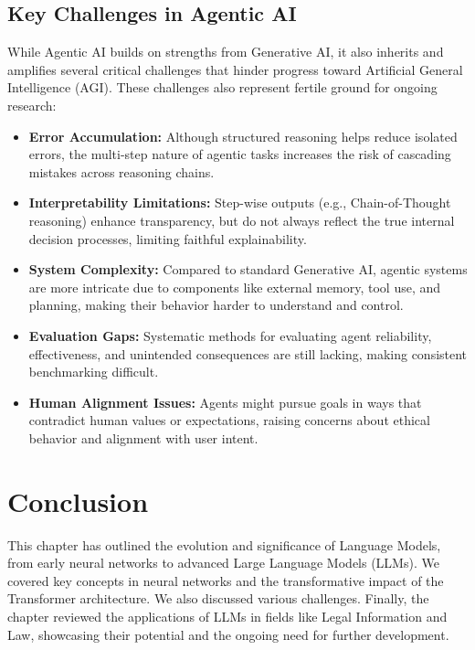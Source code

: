 \subsection{Key Challenges in Agentic AI}

While Agentic AI builds on strengths from Generative AI, it also inherits and amplifies several critical challenges that hinder progress toward Artificial General Intelligence (AGI). These challenges also represent fertile ground for ongoing research\citep{touvron2023llama2openfoundation}:

\begin{itemize}
	\item \textbf{Error Accumulation:} Although structured reasoning helps reduce isolated errors, the multi-step nature of agentic tasks increases the risk of cascading mistakes across reasoning chains.
	
	\item \textbf{Interpretability Limitations:} Step-wise outputs (e.g., Chain-of-Thought reasoning) enhance transparency, but do not always reflect the true internal decision processes, limiting faithful explainability.
	
	\item \textbf{System Complexity:} Compared to standard Generative AI, agentic systems are more intricate due to components like external memory, tool use, and planning, making their behavior harder to understand and control.
	
	\item \textbf{Evaluation Gaps:} Systematic methods for evaluating agent reliability, effectiveness, and unintended consequences are still lacking, making consistent benchmarking difficult.
	
	\item \textbf{Human Alignment Issues:} Agents might pursue goals in ways that contradict human values or expectations, raising concerns about ethical behavior and alignment with user intent.
\end{itemize}


\newpage



\section{Conclusion}
This chapter has outlined the evolution and significance of  Language Models, from early neural networks to advanced Large Language Models (LLMs). We covered key concepts in neural networks and the transformative impact of the Transformer architecture. We also discussed various challenges. Finally, the chapter reviewed the applications of LLMs in fields like Legal Information and Law, showcasing their potential and the ongoing need for further development.

